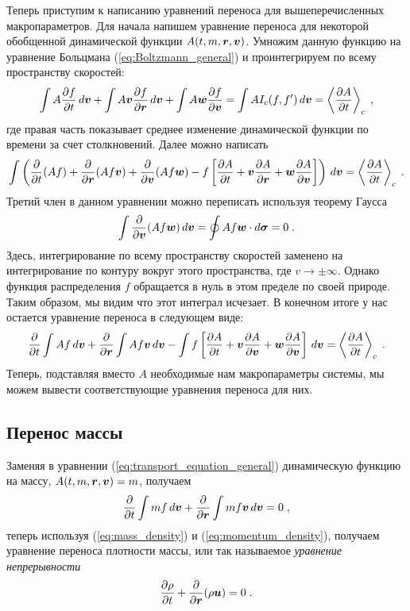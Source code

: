 Теперь приступим к написанию уравнений переноса для вышеперечисленных макропараметров. Для начала напишем
уравнение переноса для некоторой обобщенной динамической функции $A(t,m,\bm{r},\bm{v})$. 
Умножим данную функцию на уравнение Больцмана (\ref{eq:Boltzmann_general})
и проинтегрируем по всему пространству скоростей:
\begin{equation}
  \int A\frac{\partial f}{\partial t}\,d\bm{v} + \int A\bm{v}\frac{\partial f}{\partial\bm{r}}\,d\bm{v}+\int A\bm{w}\frac{\partial f}{\partial\bm{v}} 
  = \int AI_c(f,f')\,d\bm{v} = \left\langle\frac{\partial A}{\partial t}\right\rangle_c\;,
\end{equation}
где правая часть показывает среднее изменение динамической функции по времени за счет столкновений.
Далее можно написать
\begin{equation}
  \int\left(\frac{\partial}{\partial t}(Af)+\frac{\partial}{\partial\bm{r}}(Af\bm{v})+\frac{\partial}{\partial\bm{v}}(Af\bm{w})-
  f\left[\frac{\partial A}{\partial t}+\bm{v}\frac{\partial A}{\partial\bm{r}}+\bm{w}\frac{\partial A}{\partial\bm{v}}\right]\right)
  \,d\bm{v}=\left\langle\frac{\partial A}{\partial t}\right\rangle_c\;.
\end{equation}
Третий член в данном уравнении можно переписать используя теорему Гаусса
 \begin{equation}
   \int\frac{\partial}{\partial\bm{v}}(Af\bm{w})\,d\bm{v}=\oint Af\bm{w}\cdot d\bm{\sigma} = 0\;.
 \end{equation}
Здесь, интегрирование по всему пространству скоростей заменено на интегрирование по контуру вокруг этого пространства, где
$v\to\pm\infty$. Однако функция распределения $f$ обращается в нуль в этом пределе по своей природе. Таким образом,
мы видим что этот интеграл исчезает. В конечном итоге у нас остается уравнение переноса в следующем виде:
\begin{equation}\label{eq:transport_equation_general}
  \frac{\partial}{\partial t}\int Af\,d\bm{v}+\frac{\partial}{\partial\bm{r}}\int Af\bm{v}\,d\bm{v}
  -\int f\left[\frac{\partial A}{\partial t}+\bm{v}\frac{\partial A}{\partial\bm{v}}+\bm{w}\frac{\partial A}{\partial\bm{v}}\right]\,d\bm{v}
  =\left\langle\frac{\partial A}{\partial t}\right\rangle_c\;.
\end{equation}
Теперь, подставляя вместо $A$ необходимые нам макропараметры системы, мы можем вывести соответствующие уравнения переноса для них.

\subsection{Перенос массы}
Заменяя в уравнении (\ref{eq:transport_equation_general}) динамическую функцию на массу, $A(t,m,\bm{r},\bm{v})=m$, получаем
\begin{equation}
  \frac{\partial}{\partial t}\int mf\,d\bm{v} + \frac{\partial}{\partial\bm{r}}\int mf\bm{v}\,d\bm{v} = 0\;,
\end{equation}
теперь используя (\ref{eq:mass_density}) и (\ref{eq:momentum_density}), получаем уравнение переноса плотности массы,
или так называемое \emph{уравнение непрерывности}
\begin{equation}
  \frac{\partial\rho}{\partial t}+\frac{\partial}{\partial\bm{r}}(\rho\bm{u})=0\;.
\end{equation}

